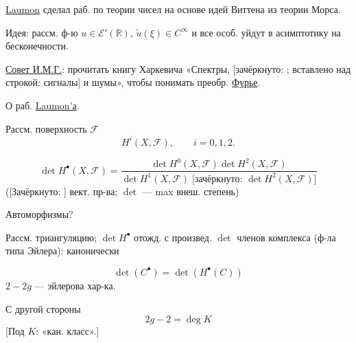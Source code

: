 \underline{Laumon} сделал раб. по теории чисел на основе идей Виттена
из теории Морса.

Идея: рассм. ф-ю $u\in\mathcal E'(\mathbb R)$,
$\widetilde u(\xi)\in C^\infty$
и все особ. уйдут в асимптотику на бесконечности.

\underline{Совет И.М.Г.}: прочитать книгу Харкевича
«Спектры, [зачёркнуто:
;
вставлено над строкой: сигналы] и шумы»,
чтобы понимать преобр. \underline{Фурье}.

О раб. \underline{Laumon'а}.

\begin{center}
\end{center}

Рассм. поверхность $\mathcal F$
\begin{equation*}
 H^i(X,\mathcal F),\qquad i=0,1,2.
\end{equation*}

\begin{equation}
 \det H^\bullet(X,\mathcal F)=
 \frac{\det H^0(X,\mathcal F)\det H^2(X,\mathcal F)}
 {\det H^1(X,\mathcal F)\;
 \text{[зачёркнуто: }\det H^2(X,\mathcal F)\text{]}}
 \tag{1}
\end{equation}
([Зачёркнуто:
]
вект. пр-ва;
$\det$ — max внеш. степень)

Автоморфизмы?

Рассм. триангуляцию; $\det H^\bullet$ отожд. с произвед. $\det$
членов комплекса (ф-ла типа Эйлера): канонически


\begin{equation*}
\det(C^\bullet)=\det(H^\bullet(C)) \tag{2}
\end{equation*}
$2-2g$ — эйлерова хар-ка.

С другой стороны
\begin{equation*}
2g-2=\operatorname{deg}K
\end{equation*}
[Под $K$: «кан. класс».]

